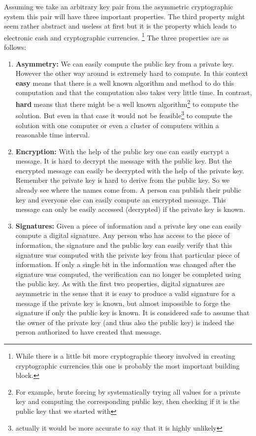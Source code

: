 \documentclass[a4paper,12pt,oneside,openany]{book}
\begin{document}
Assuming we take an arbitrary key pair from the asymmetric cryptographic system this pair will have three important properties.
The third property might seem rather abstract and useless at first but it is the property which leads to electronic cash and cryptographic currencies. \footnote{While there is a little bit more cryptographic theory involved in creating cryptographic currencies this one is probably the most important building block.}
The three properties are as follows:
\begin{enumerate}
\item \textbf{Asymmetry:} We can easily compute the public key from a private key.
However the other way around is extremely hard to compute.
In this context \textbf{\gls{easy}} means that there is a well known algorithm and method to do this computation and that the computation also takes very little time.
In contrast, \textbf{\gls{hard}} means that there might be a well known algorithm\footnote{For example, brute forcing by systematically trying all values for a private key and computing the corresponding public key, then checking if it is the public key that we started with} to compute the solution.
But even in that case it would not be feasible\footnote{actually it would be more accurate to say that it is highly  unlikely} to compute the solution with one computer or even a cluster of computers within a reasonable time interval.
\item \textbf{Encryption:} With the help of the public key one can easily encrypt a message.
It is hard to decrypt the message with the public key.
But the encrypted message can easily be decrypted with the help of the private key.
Remember the private key is hard to derive from the public key.
So we already see where the names come from.
A person can publish their public key and everyone else can easily compute an encrypted message.
This message can only be easily accessed (decrypted) if the private key is known.
\item \textbf{Signatures:} Given a piece of information and a private key one can easily compute a digital signature.
  Any person who has access to the piece of information, the signature and the public key can easily verify that this signature was computed with the private key from that particular piece of information.
  If only a single bit in the information was changed after the signature was computed, the verification can no longer be completed using the public key.
  As with the first two properties, digital signatures are asymmetric in the sense that it is easy to produce a valid signature for a message if the private key is known, but almost impossible to forge the signature if only the public key is known.
  It is considered safe to assume that the owner of the private key (and thus also the public key) is indeed the person authorized to have created that message.
\end{enumerate}
\end{document}
